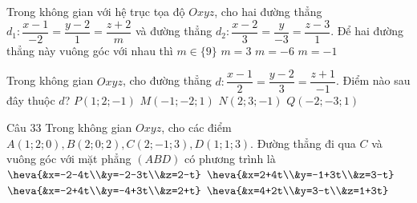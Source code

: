\begin{ex}%
Trong không gian với hệ trục tọa độ $O x y z$, cho hai đường thẳng \\ $d_1\colon \dfrac{x-1}{-2}=\dfrac{y-2}{1}=\dfrac{z+2}{m}$ và đường thẳng $d_2\colon \dfrac{x-2}{3}=\dfrac{y}{-3}=\dfrac{z-3}{1}$. Để hai đường thẳng này vuông góc với nhau thì
\choice
{\True $m \in\{9\}$}
{$m=3$}
{$m=-6$}
{$m=-1$}
\end{ex}

\begin{ex}%
Trong không gian $Oxyz$, cho đường thẳng $d\colon \dfrac{x-1}{2}=\dfrac{y-2}{3}=\dfrac{z+1}{-1}$. Điểm nào sau đây thuộc $d$?
\choice
{\True $P\left( 1;2;-1 \right)$}
{$M\left( -1;-2;1 \right)$}
{$N\left( 2;3;-1 \right)$}
{$Q\left( -2;-3;1 \right)$}
\end{ex}

\begin{ex}Câu 33%
Trong không gian $Oxyz$, cho các điểm $A(1;2;0), B(2;0;2), C(2;-1;3), D(1;1;3)$. Đường thẳng đi qua $C$ và vuông góc với mặt phẳng $(ABD)$ có phương trình là
\choice
{$\heva{&x=-2-4t\\&y=-2-3t\\&z=2-t}$}
{$\heva{&x=2+4t\\&y=-1+3t\\&z=3-t}$}
{\True $\heva{&x=-2+4t\\&y=-4+3t\\&z=2+t}$}
{$\heva{&x=4+2t\\&y=3-t\\&z=1+3t}$}
\end{ex}

